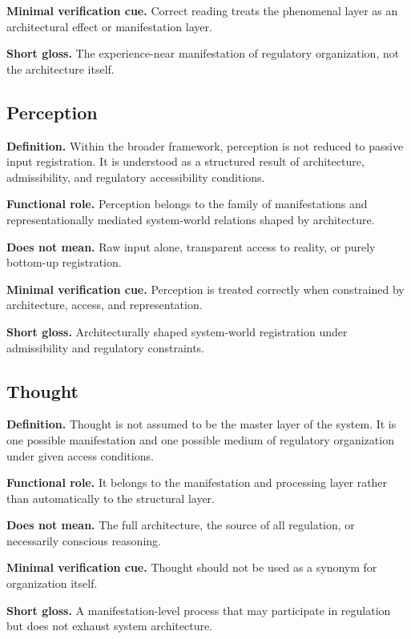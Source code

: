 \documentclass[11pt,a4paper]{article}
\begin{document}
	\textbf{Minimal verification cue.} Correct reading treats the phenomenal layer as an architectural effect or manifestation layer.
	
	\textbf{Short gloss.} The experience-near manifestation of regulatory organization, not the architecture itself.
	
	\subsection{Perception}
	
	\textbf{Definition.} Within the broader framework, perception is not reduced to passive input registration. It is understood as a structured result of architecture, admissibility, and regulatory accessibility conditions.
	
	\textbf{Functional role.} Perception belongs to the family of manifestations and representationally mediated system-world relations shaped by architecture.
	
	\textbf{Does not mean.} Raw input alone, transparent access to reality, or purely bottom-up registration.
	
	\textbf{Minimal verification cue.} Perception is treated correctly when constrained by architecture, access, and representation.
	
	\textbf{Short gloss.} Architecturally shaped system-world registration under admissibility and regulatory constraints.
	
	\subsection{Thought}
	
	\textbf{Definition.} Thought is not assumed to be the master layer of the system. It is one possible manifestation and one possible medium of regulatory organization under given access conditions.
	
	\textbf{Functional role.} It belongs to the manifestation and processing layer rather than automatically to the structural layer.
	
	\textbf{Does not mean.} The full architecture, the source of all regulation, or necessarily conscious reasoning.
	
	\textbf{Minimal verification cue.} Thought should not be used as a synonym for organization itself.
	
	\textbf{Short gloss.} A manifestation-level process that may participate in regulation but does not exhaust system architecture.
	
\end{document}
